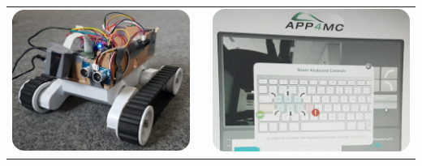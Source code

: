 \begin{tabularx}{\textwidth}{cXc}
		\includegraphics{rover.png}&&%
		\includegraphics{page.png}%
\end{tabularx}
